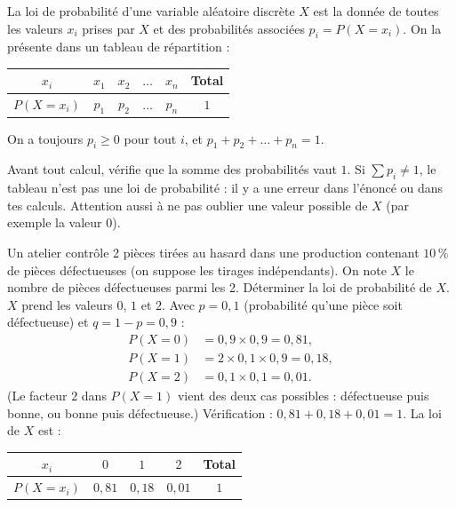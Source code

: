 \documentclass[11pt]{article}
\newcommand{\cle}[1]{{\popxbold\color{popdark}#1}}
\begin{document}
\begin{definition}
La \cle{loi de probabilité} d'une variable aléatoire discrète $X$ est la donnée de toutes les valeurs $x_i$ prises par $X$ et des probabilités associées $p_i = P(X = x_i)$. On la présente dans un \cle{tableau de répartition} :
\begin{center}
\begin{tabular}{|c|ccccc|}\hline
$x_i$ & $x_1$ & $x_2$ & $\dots$ & $x_n$ & Total \\ \hline
$P(X=x_i)$ & $p_1$ & $p_2$ & $\dots$ & $p_n$ & $1$ \\ \hline
\end{tabular}
\end{center}
On a toujours $p_i \geq 0$ pour tout $i$, et $p_1 + p_2 + \dots + p_n = 1$.
\end{definition}

\begin{attention}
Avant tout calcul, vérifie que la somme des probabilités vaut $1$. Si $\sum p_i \neq 1$, le tableau n'est pas une loi de probabilité : il y a une erreur dans l'énoncé ou dans tes calculs. Attention aussi à ne pas oublier une valeur possible de $X$ (par exemple la valeur $0$).
\end{attention}

\begin{exoresolu}
Un atelier contrôle 2 pièces tirées au hasard dans une production contenant $10\,\%$ de pièces défectueuses (on suppose les tirages indépendants). On note $X$ le nombre de pièces défectueuses parmi les 2. Déterminer la loi de probabilité de $X$.
\tcblower
$X$ prend les valeurs $0$, $1$ et $2$. Avec $p = 0{,}1$ (probabilité qu'une pièce soit défectueuse) et $q = 1-p = 0{,}9$ :
\begin{align*}
P(X=0) &= 0{,}9 \times 0{,}9 = 0{,}81,\\
P(X=1) &= 2 \times 0{,}1 \times 0{,}9 = 0{,}18,\\
P(X=2) &= 0{,}1 \times 0{,}1 = 0{,}01.
\end{align*}
(Le facteur $2$ dans $P(X=1)$ vient des deux cas possibles : défectueuse puis bonne, ou bonne puis défectueuse.) Vérification : $0{,}81 + 0{,}18 + 0{,}01 = 1$. La loi de $X$ est :
\begin{center}
\begin{tabular}{|c|ccc|c|}\hline
$x_i$ & $0$ & $1$ & $2$ & Total \\ \hline
$P(X=x_i)$ & $0{,}81$ & $0{,}18$ & $0{,}01$ & $1$ \\ \hline
\end{tabular}
\end{center}
\end{exoresolu}
\end{document}

